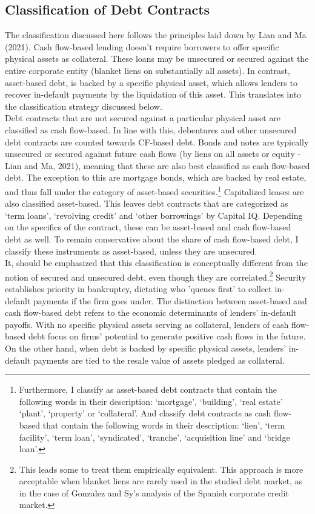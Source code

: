 \documentclass[12pt]{article}
\begin{document}
\subsection{Classification of Debt Contracts \label{sec:classification}}
The classification discussed here follows the principles laid down by Lian and Ma (2021). Cash flow-based lending doesn't require borrowers to offer specific physical assets as collateral. These loans may be unsecured or secured against the entire corporate entity (blanket liens on substantially all assets). In contrast, asset-based debt, is backed by a specific physical asset, which allows lenders to recover in-default payments by the liquidation of this asset. This translates into the classification strategy discussed below. \vspace{3mm} \\
Debt contracts that are not secured against a particular physical asset are classified as cash flow-based. In line with this, debentures and other unsecured debt contracts are counted towards CF-based debt. Bonds and notes are typically unsecured or secured against future cash flows (by liens on all assets or equity - Lian and Ma, 2021), meaning that these are also best classified as cash flow-based debt. The exception to this are mortgage bonds, which are backed by real estate, and thus fall under the category of asset-based securities.\footnote{Furthermore, I classify  as asset-based debt contracts that contain the following words in their description: `mortgage', `building', `real estate' `plant', `property' or `collateral'. And classify debt contracts as cash flow-based that contain the following words in their description: `lien', `term facility', `term loan', `syndicated', `tranche', `acquisition line' and `bridge loan'.} Capitalized leases are also classified asset-based. This leaves debt contracts that are categorized as `term loans', `revolving credit' and `other borrowings' by Capital IQ. Depending on the specifics of the contract, these can be asset-based and cash flow-based debt as well. To remain conservative about the share of cash  flow-based debt, I classify these instruments as asset-based, unless they are unsecured.  \vspace{3mm} \\
It, should be emphasized that this classification is conceptually different from the notion of secured and unsecured debt, even though they are correlated.\footnote{This leads some to treat them empirically equivalent. This approach is more acceptable when blanket liens are rarely used in the studied debt market, as in the case of Gonzalez and Sy's analysis of the Spanish corporate credit market.} Security establishes priority in bankruptcy, dictating who 'queues first' to collect in-default payments if the firm goes under. The distinction between asset-based and cash flow-based debt refers to the economic determinants of lenders' in-default payoffs. With no specific physical assets serving as collateral, lenders of cash flow-based debt focus on firms' potential to generate positive cash flows in the future. On the other hand, when debt is backed by specific physical assets, lenders' in-default payments are tied to the resale value of assets pledged as collateral.  \vspace{3mm} \\
\end{document}
